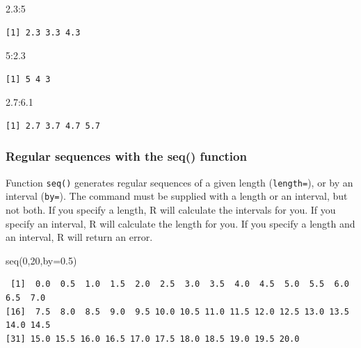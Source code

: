\documentclass[
  13,
  letterpaper,
]{report}
\newenvironment{Shaded}{\begin{snugshade}}{\end{snugshade}}
\newcommand{\AttributeTok}[1]{\textcolor[rgb]{0.40,0.45,0.13}{#1}}
\newcommand{\DecValTok}[1]{\textcolor[rgb]{0.68,0.00,0.00}{#1}}
\newcommand{\FloatTok}[1]{\textcolor[rgb]{0.68,0.00,0.00}{#1}}
\newcommand{\FunctionTok}[1]{\textcolor[rgb]{0.28,0.35,0.67}{#1}}
\newcommand{\NormalTok}[1]{\textcolor[rgb]{0.00,0.23,0.31}{#1}}
\newcommand{\SpecialCharTok}[1]{\textcolor[rgb]{0.37,0.37,0.37}{#1}}
\begin{document}
\begin{Shaded}
\begin{Highlighting}[]
\FloatTok{2.3}\SpecialCharTok{:}\DecValTok{5}
\end{Highlighting}
\end{Shaded}

\begin{verbatim}
[1] 2.3 3.3 4.3
\end{verbatim}

\begin{Shaded}
\begin{Highlighting}[]
\DecValTok{5}\SpecialCharTok{:}\FloatTok{2.3}
\end{Highlighting}
\end{Shaded}

\begin{verbatim}
[1] 5 4 3
\end{verbatim}

\begin{Shaded}
\begin{Highlighting}[]
\FloatTok{2.7}\SpecialCharTok{:}\FloatTok{6.1}
\end{Highlighting}
\end{Shaded}

\begin{verbatim}
[1] 2.7 3.7 4.7 5.7
\end{verbatim}

\subsubsection{Regular sequences with the seq()
function}\label{sec-05-make-seq-seq}

Function \texttt{seq()} generates regular sequences of a given length
(\texttt{length=}), or by an interval (\texttt{by=}). The command must
be supplied with a length or an interval, but not both. If you specify a
length, R will calculate the intervals for you. If you specify an
interval, R will calculate the length for you. If you specify a length
and an interval, R will return an error.

\begin{Shaded}
\begin{Highlighting}[]
\FunctionTok{seq}\NormalTok{(}\DecValTok{0}\NormalTok{,}\DecValTok{20}\NormalTok{,}\AttributeTok{by=}\FloatTok{0.5}\NormalTok{)}
\end{Highlighting}
\end{Shaded}

\begin{verbatim}
 [1]  0.0  0.5  1.0  1.5  2.0  2.5  3.0  3.5  4.0  4.5  5.0  5.5  6.0  6.5  7.0
[16]  7.5  8.0  8.5  9.0  9.5 10.0 10.5 11.0 11.5 12.0 12.5 13.0 13.5 14.0 14.5
[31] 15.0 15.5 16.0 16.5 17.0 17.5 18.0 18.5 19.0 19.5 20.0
\end{verbatim}
\end{document}

